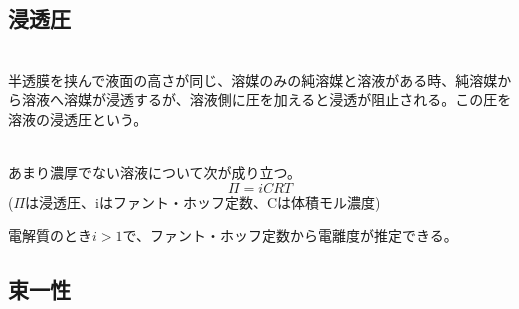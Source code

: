 \documentclass[dvipdfmx,uplatex]{jsarticle}
\begin{document}
\subsection{浸透圧}
\begin{defi}[浸透圧] \mbox{} \\
半透膜を挟んで液面の高さが同じ、溶媒のみの純溶媒と溶液がある時、純溶媒から溶液へ溶媒が浸透するが、溶液側に圧を加えると浸透が阻止される。この圧を溶液の浸透圧という。
\end{defi}
\begin{theo} \mbox{} \\
あまり濃厚でない溶液について次が成り立つ。 \\
\[
\Pi = iCRT
\]
($\Pi$は浸透圧、iはファント・ホッフ定数、Cは体積モル濃度)
\end{theo}
電解質のとき$i>1$で、ファント・ホッフ定数から電離度が推定できる。

\subsection{束一性}
\subsection{}
\subsection{}
\subsection{}
\subsection{}
\subsubsection{}
\end{document}
